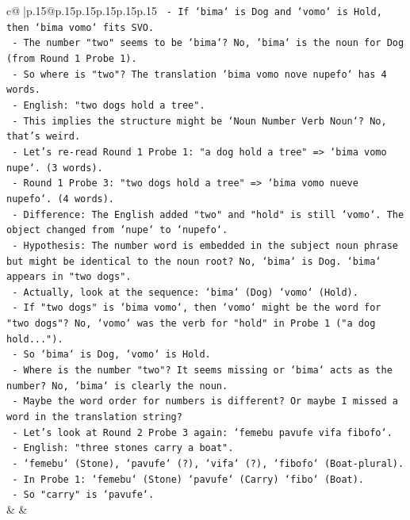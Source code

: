 \documentclass{article}
\begin{document}
{\begin{supertabular}{c@{$\;$}|p{.15\linewidth}@{}p{.15\linewidth}p{.15\linewidth}p{.15\linewidth}p{.15\linewidth}p{.15\linewidth}}
{{{\texttt{       {-} If `bima` is Dog and `vomo` is Hold, then `bima vomo` fits SVO.} \\
\texttt{       {-} The number "two" seems to be `bima`? No, `bima` is the noun for Dog (from Round 1 Probe 1).} \\
\texttt{       {-} So where is "two"? The translation `bima vomo nove nupefo` has 4 words.} \\
\texttt{       {-} English: "two dogs hold a tree".} \\
\texttt{       {-} This implies the structure might be `Noun Number Verb Noun`? No, that's weird.} \\
\texttt{       {-} Let's re{-}read Round 1 Probe 1: "a dog hold a tree" => `bima vomo nupe`. (3 words).} \\
\texttt{       {-} Round 1 Probe 3: "two dogs hold a tree" => `bima vomo nueve nupefo`. (4 words).} \\
\texttt{       {-} Difference: The English added "two" and "hold" is still `vomo`. The object changed from `nupe` to `nupefo`.} \\
\texttt{       {-} Hypothesis: The number word is embedded in the subject noun phrase but might be identical to the noun root? No, `bima` is Dog. `bima` appears in "two dogs".} \\
\texttt{       {-} Actually, look at the sequence: `bima` (Dog) `vomo` (Hold).} \\
\texttt{       {-} If "two dogs" is `bima vomo`, then `vomo` might be the word for "two dogs"? No, `vomo` was the verb for "hold" in Probe 1 ("a dog hold...").} \\
\texttt{       {-} So `bima` is Dog, `vomo` is Hold.} \\
\texttt{       {-} Where is the number "two"? It seems missing or `bima` acts as the number? No, `bima` is clearly the noun.} \\
\texttt{       {-} Maybe the word order for numbers is different? Or maybe I missed a word in the translation string?} \\
\texttt{       {-} Let's look at Round 2 Probe 3 again: `femebu pavufe vifa fibofo`.} \\
\texttt{       {-} English: "three stones carry a boat".} \\
\texttt{       {-} `femebu` (Stone), `pavufe` (?), `vifa` (?), `fibofo` (Boat{-}plural).} \\
\texttt{       {-} In Probe 1: `femebu` (Stone) `pavufe` (Carry) `fibo` (Boat).} \\
\texttt{       {-} So "carry" is `pavufe`.} \\
            }
        }
    }
    & & \\ \\


\end{supertabular}}
\end{document}
